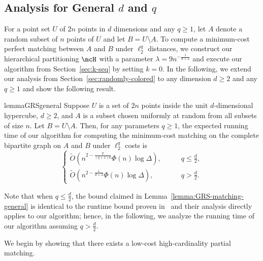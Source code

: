 \subsection{Analysis for General \texorpdfstring{$d$}{} and \texorpdfstring{$q$}{}}\label{sec:appendix-GRS}
For a point set $U$ of $2n$ points in $d$ dimensions and any $q\ge 1$, let $A$ denote a random subset of $n$ points of $U$ and let $B=U\setminus A$. 
To compute a minimum-cost perfect matching between $A$ and $B$ under $\ell_2^q$ distances, we construct our hierarchical partitioning $\mcH$ with a parameter $\lambda=9n^{-\frac{1}{d+2}}$ and execute our algorithm from Section~\ref{sec:k-seq} by setting $k=0$. In the following, we extend our analysis from Section~\ref{sec:randomly-colored} to any dimension $d\ge 2$ and any $q\ge 1$ and show the following result.


\begin{restatable}{lemma}{GRSgeneral}\label{lemma:GRS-matching-general}
    Suppose $U$ is a set of $2n$ points inside the unit $d$-dimensional hypercube, $d\ge 2$, and $A$ is a subset chosen uniformly at random from all subsets of size $n$. Let $B=U\setminus A$. Then, for any parameters $q\ge 1$, the expected running time of our algorithm for computing the minimum-cost matching on the complete bipartite graph on $A$ and $B$ under $\ell_2^q$ costs is
    \begin{equation*}
    \begin{cases}
        \tilde{O}(n^{2-\frac{q}{(q+1)d}}\Phi(n)\log \Delta),\qquad &q\le\frac{d}{2},\\
        \tilde{O}(n^{2-\frac{1}{d+2}}\Phi(n)\log \Delta),\qquad &q>\frac{d}{2}.
    \end{cases}
\end{equation*}
\end{restatable}

Note that when $q\le \frac{d}{2}$, the bound claimed in Lemma~\ref{lemma:GRS-matching-general} is identical to the runtime bound proven in~\cite[Theorem B.2]{gattani2023robust} and their analysis directly applies to our algorithm; hence, in the following, we analyze the running time of our algorithm assuming $q>\frac{d}{2}$.

We begin by showing that there exists a low-cost high-cardinality partial matching.

